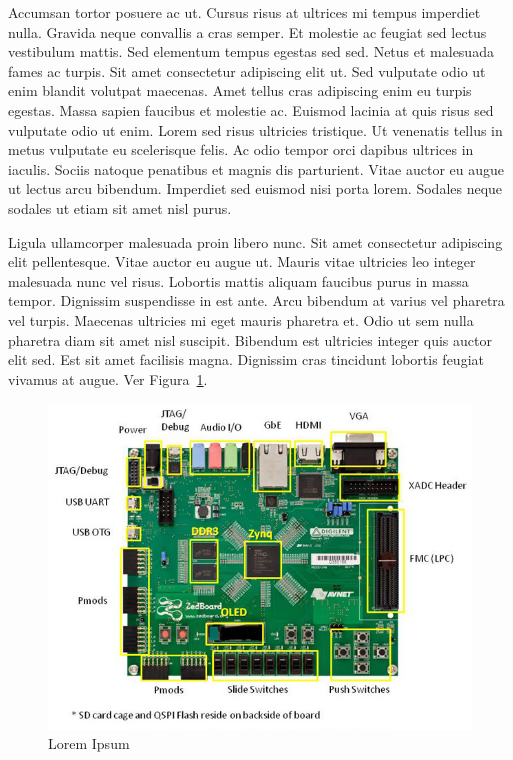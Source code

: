 \documentclass[a4paper,12pt,twoside,openright]{report}
\begin{document}
Accumsan tortor posuere ac ut. Cursus risus at ultrices mi tempus imperdiet nulla. Gravida neque convallis a cras semper. Et molestie ac feugiat sed lectus vestibulum mattis. Sed elementum tempus egestas sed sed. Netus et malesuada fames ac turpis. Sit amet consectetur adipiscing elit ut. Sed vulputate odio ut enim blandit volutpat maecenas. Amet tellus cras adipiscing enim eu turpis egestas. Massa sapien faucibus et molestie ac. Euismod lacinia at quis risus sed vulputate odio ut enim. Lorem sed risus ultricies tristique. Ut venenatis tellus in metus vulputate eu scelerisque felis. Ac odio tempor orci dapibus ultrices in iaculis. Sociis natoque penatibus et magnis dis parturient. Vitae auctor eu augue ut lectus arcu bibendum. Imperdiet sed euismod nisi porta lorem. Sodales neque sodales ut etiam sit amet nisl purus.

Ligula ullamcorper malesuada proin libero nunc. Sit amet consectetur adipiscing elit pellentesque. Vitae auctor eu augue ut. Mauris vitae ultricies leo integer malesuada nunc vel risus. Lobortis mattis aliquam faucibus purus in massa tempor. Dignissim suspendisse in est ante. Arcu bibendum at varius vel pharetra vel turpis. Maecenas ultricies mi eget mauris pharetra et. Odio ut sem nulla pharetra diam sit amet nisl suscipit. Bibendum est ultricies integer quis auctor elit sed. Est sit amet facilisis magna. Dignissim cras tincidunt lobortis feugiat vivamus at augue. Ver Figura~\ref{image4}.

\begin{figure}[H]
  \centering
    \includegraphics[scale=0.61]{figures/example_image.jpg}
  \caption{Lorem Ipsum}
  \label{image4}
\end{figure}
\end{document}
